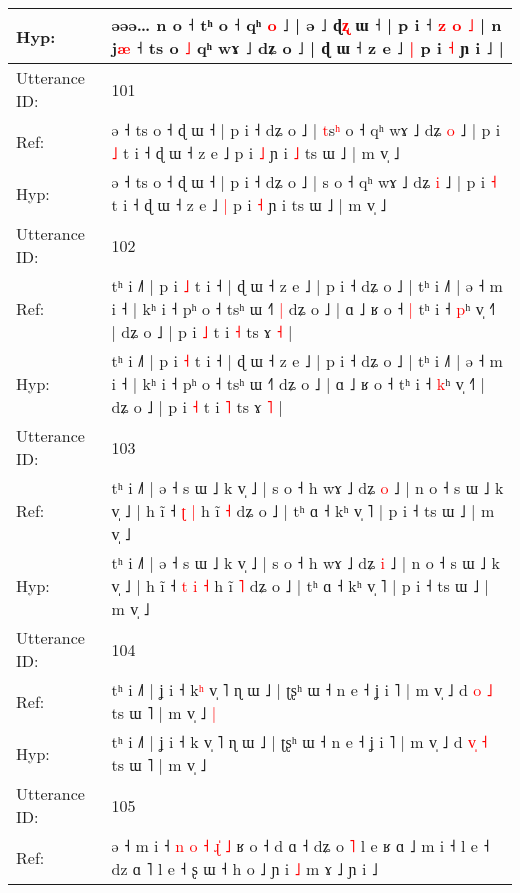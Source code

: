 \documentclass[10pt]{article}
\DeclareRobustCommand{\hl}[1]{{\textcolor{red}{#1}}}
\begin{document}
\begin{longtable}{ll}
 \\
Hyp: & əəə… n o ˧\hl{}\hl{} t\hl{}ʰ o ˧ qʰ \hl{}\hl{o} ˩ | ə ˩ ɖ\hl{ʐ} ɯ ˧ | p i ˧\hl{ }\hl{z}\hl{ }\hl{o}\hl{ }\hl{˩} | n j\hl{æ} ˧\hl{}\hl{} ts\hl{} o \hl{˩} qʰ wɤ ˩ dʑ o ˩ | ɖ ɯ ˧ z e ˩\hl{ }\hl{|} p i \hl{˧} ɲ i ˩ |
 \\
\midrule
Utterance ID: & 101 \\
Ref: & ə ˧ ts o ˧ ɖ ɯ ˧ | p i ˧ dʑ o ˩ | \hl{t}s\hl{ʰ} o ˧ qʰ wɤ ˩ dʑ \hl{o} ˩ | p i \hl{˩} t i ˧ ɖ ɯ ˧ z e ˩\hl{}\hl{} p i \hl{˩} ɲ i\hl{ }\hl{˩} ts ɯ ˩ | m v̩ ˩
 \\
Hyp: & ə ˧ ts o ˧ ɖ ɯ ˧ | p i ˧ dʑ o ˩ | \hl{}s\hl{} o ˧ qʰ wɤ ˩ dʑ \hl{i} ˩ | p i \hl{˧} t i ˧ ɖ ɯ ˧ z e ˩\hl{ }\hl{|} p i \hl{˧} ɲ i\hl{}\hl{} ts ɯ ˩ | m v̩ ˩
 \\
\midrule
Utterance ID: & 102 \\
Ref: & tʰ i ˩˥ | p i \hl{˩} t i ˧ | ɖ ɯ ˧ z e ˩ | p i ˧ dʑ o ˩ | tʰ i ˩˥ | ə ˧ m i ˧ | kʰ i ˧ pʰ o ˧ tsʰ ɯ ˧˥\hl{ }\hl{|} dʑ o ˩ | ɑ ˩ ʁ o ˧\hl{ }\hl{|} tʰ i ˧ \hl{p}ʰ v̩ ˧˥ | dʑ o ˩ | p i \hl{˩} t i \hl{˧} ts ɤ \hl{˧} |
 \\
Hyp: & tʰ i ˩˥ | p i \hl{˧} t i ˧ | ɖ ɯ ˧ z e ˩ | p i ˧ dʑ o ˩ | tʰ i ˩˥ | ə ˧ m i ˧ | kʰ i ˧ pʰ o ˧ tsʰ ɯ ˧˥\hl{}\hl{} dʑ o ˩ | ɑ ˩ ʁ o ˧\hl{}\hl{} tʰ i ˧ \hl{k}ʰ v̩ ˧˥ | dʑ o ˩ | p i \hl{˧} t i \hl{˥} ts ɤ \hl{˥} |
 \\
\midrule
Utterance ID: & 103 \\
Ref: & tʰ i ˩˥ | ə ˧ s ɯ ˩ k v̩ ˩ | s o ˧ h wɤ ˩ dʑ \hl{o} ˩ | n o ˧ s ɯ ˩ k v̩ ˩ | h ĩ ˧\hl{}\hl{} \hl{ʈ} \hl{|} h ĩ \hl{˧} dʑ o ˩ | tʰ ɑ ˧ kʰ v̩ ˥ | p i ˧ ts ɯ ˩ | m v̩ ˩
 \\
Hyp: & tʰ i ˩˥ | ə ˧ s ɯ ˩ k v̩ ˩ | s o ˧ h wɤ ˩ dʑ \hl{i} ˩ | n o ˧ s ɯ ˩ k v̩ ˩ | h ĩ ˧\hl{ }\hl{t} \hl{i} \hl{˧} h ĩ \hl{˥} dʑ o ˩ | tʰ ɑ ˧ kʰ v̩ ˥ | p i ˧ ts ɯ ˩ | m v̩ ˩
 \\
\midrule
Utterance ID: & 104 \\
Ref: & tʰ i ˩˥ | ʝ i ˧ k\hl{ʰ} v̩ ˥ ɳ ɯ ˩ | ʈʂʰ ɯ ˧ n e ˧ ʝ i ˥ | m v̩ ˩ d \hl{}\hl{o} \hl{˩} ts ɯ ˥ | m v̩ ˩\hl{ }\hl{|}
 \\
Hyp: & tʰ i ˩˥ | ʝ i ˧ k\hl{} v̩ ˥ ɳ ɯ ˩ | ʈʂʰ ɯ ˧ n e ˧ ʝ i ˥ | m v̩ ˩ d \hl{v}\hl{̩} \hl{˧} ts ɯ ˥ | m v̩ ˩\hl{}\hl{}
 \\
\midrule
Utterance ID: & 105 \\
Ref: & ə ˧ m i ˧ \hl{n} \hl{o} \hl{˧} \hl{ɻ}\hl{̍} \hl{˩} ʁ o ˧ d ɑ ˧ dʑ o \hl{˥} l e\hl{}\hl{} ʁ ɑ ˩ m i ˧\hl{}\hl{} l e ˧ dz ɑ ˥\hl{}\hl{} l e ˧ ʂ ɯ ˧ h o ˩\hl{}\hl{} ɲ i \hl{˩} m ɤ ˩ ɲ i ˩\hl{}\hl{}
 \\

\end{longtable}
\end{document}
